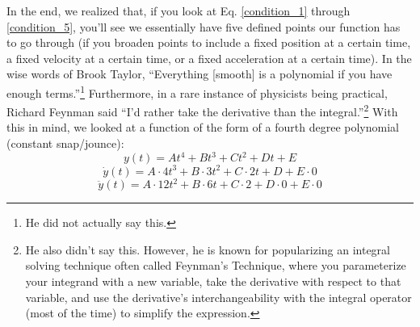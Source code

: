 \documentclass[nofoot,pdf-a,balance,colorlinks,upint,subscriptcorrection,varvw,mathalfa=cal=boondoxo]{asmeconf}
\begin{document}
    In the end, we realized that, if you look at Eq. \eqref{condition_1} through \eqref{condition_5}, you'll see we essentially have five defined points our function has to go through (if you broaden points to include a fixed position at a certain time, a fixed velocity at a certain time, or a fixed acceleration at a certain time). In the wise words of Brook Taylor, ``Everything [smooth] is a polynomial if you have enough terms.''\footnote{He did not actually say this.} Furthermore, in a rare instance of physicists being practical, Richard Feynman said ``I'd rather take the derivative than the integral.''\footnote{He also didn't say this. However, he is known for popularizing an integral solving technique often called Feynman's Technique, where you parameterize your integrand with a new variable, take the derivative with respect to that variable, and use the derivative's interchangeability with the integral operator (most of the time) to simplify the expression.}  With this in mind, we looked at a function of the form of a fourth degree polynomial (constant snap/jounce):
    \begin{equation}\label{form_1}
        y\left(t\right) = At^4 + Bt^3 + Ct^2 + Dt + E
    \end{equation}
    \begin{equation}\label{form_2}
        \dot{y}\left(t\right) = A\cdot4t^3 + B\cdot 3t^2 + C \cdot 2t + D + E\cdot 0
    \end{equation}
    \begin{equation}\label{form_3}
        \ddot{y}\left(t\right) = A\cdot12t^2 + B\cdot 6t + C \cdot 2 + D\cdot0 + E\cdot 0
    \end{equation}
\end{document}
